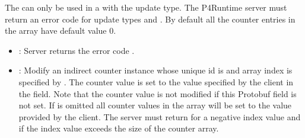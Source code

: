 \documentclass[11pt]{article}
\begin{document}
{%
\noindent{}The  can only be used in a  with the  update
type. The P4Runtime server must return an  error code for
update types  and . By default all the counter entries in the
array have default value 0.%

\begin{itemize}[noitemsep,topsep=\mdcompacttopsep]%

\item{}: Server returns the error code .%

\item{}: Modify an indirect counter instance whose unique id is 
and array index is specified by . The counter value is set to the value
specified by the client in the  field. Note that the counter value is
not modified if this Protobuf field is not set. If  is omitted all
counter values in the array will be set to the value provided by the
client. The server must return  for a negative index value
and  if the index value exceeds the size of the counter array.%


\end{itemize}}
\end{document}
